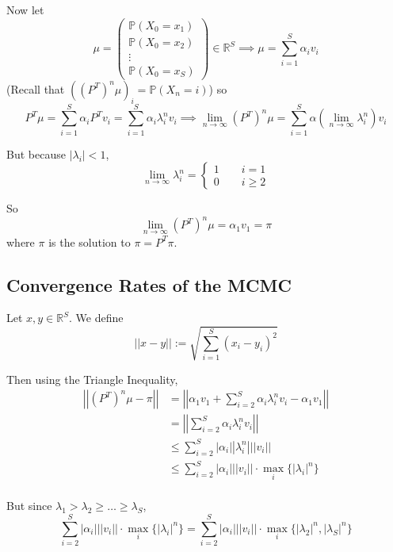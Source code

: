 \documentclass[12pt]{article}
\renewcommand{\P}{\mathbb{P}}
\newcommand{\R}{\mathbb{R}}
\newcommand{\abs}[1]{\left\vert #1 \right\vert}
\begin{document}
        Now let 
        \[\mu = \begin{pmatrix}
            \P(X_0 = x_1)\\
            \P(X_0 = x_2)\\
            \vdots\\
            \P(X_0 = x_S)
        \end{pmatrix} \in \R^S \implies \mu = \sum_{i=1}^S \alpha_i v_i\]
        (Recall that $((P^T)^n\mu)_i = \P(X_n = i)$)
        so 
        \[P^T \mu = \sum_{i=1}^S \alpha_i P^T v_i = \sum_{i=1}^S \alpha_i \lambda_i^n v_i \implies \lim_{n\to \infty} (P^T)^n \mu = \sum_{i=1}^S \alpha \left(\lim_{n\to \infty} \lambda_i^n \right)v_i\]

        But because $\abs{\lambda_i} < 1$,
        \[\lim_{n\to \infty} \lambda_i^n = \begin{cases}
            1 \qquad i = 1\\
            0 \qquad i \geq 2
        \end{cases}\]

        So 
        \[\lim_{n\to \infty} (P^T)^n\mu = \alpha_1 v_1 = \pi\]
        where $\pi$ is the solution to $\pi = P^T \pi$. 

    \subsection{Convergence Rates of the MCMC}
        Let $x, y \in \R^S$. We define 
        \[\abs{\abs{x - y}} := \sqrt{\sum_{i=1}^S (x_i - y_i)^2}\]

        Then using the Triangle Inequality, 
        \begin{align}
            \abs{\abs{(P^T)^n \mu - \pi}} &= \abs{\abs{\alpha_1 v_1 + \sum_{i=2}^S \alpha_i \lambda_i^n v_i - \alpha_1 v_1}}\\
            &= \abs{\abs{\sum_{i=2}^S \alpha_i \lambda_i^n v_i}}\\
            &\leq \sum_{i=2}^S \abs{\alpha_i} \abs{\lambda_i^n} \abs{\abs{v_i}}\\
            & \leq \sum_{i=2}^S \abs{\alpha_i} \abs{\abs{v_i}} \cdot \max_i \{\abs{\lambda_i}^n\}\\
        \end{align}

        But since $\lambda_1 > \lambda_2 \geq \dots \geq \lambda_S$,
        \[\sum_{i=2}^S \abs{\alpha_i} \abs{\abs{v_i}} \cdot \max_i \{\abs{\lambda_i}^n\} = \sum_{i=2}^S \abs{\alpha_i} \abs{\abs{v_i}} \cdot \max_i \{\abs{\lambda_2}^n, \abs{\lambda_S}^n\}\]
\end{document}

